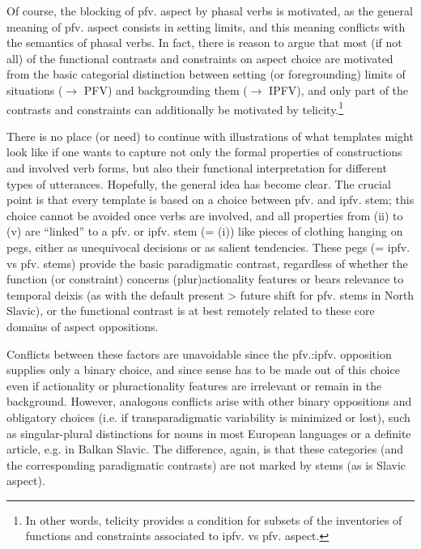 \documentclass[output=paper]{langscibook}
\begin{document}
Of course, the blocking of pfv. aspect by phasal verbs is motivated, as the general meaning of pfv. aspect consists in setting limits, and this meaning conflicts with the semantics of phasal verbs. In fact, there is reason to argue that most (if not all) of the functional contrasts and constraints on aspect choice are motivated from the basic categorial distinction between setting (or foregrounding) limits of situations (${\rightarrow}$ PFV) and backgrounding them (${\rightarrow}$ IPFV), and only part of the contrasts and constraints can additionally be motivated by telicity.\footnote{In other words, telicity provides a condition for subsets of the inventories of functions and constraints associated to ipfv. vs pfv. aspect.}

There is no place (or need) to continue with illustrations of what templates might look like if one wants to capture not only the formal properties of constructions and involved verb forms, but also their functional interpretation for different types of utterances. Hopefully, the general idea has become clear. The crucial point is that every template is based on a choice between pfv. and ipfv. stem; this choice cannot be avoided once verbs are involved, and all properties from (ii) to (v) are “linked” to a pfv. or ipfv. stem (= (i)) like pieces of clothing hanging on pegs, either as unequivocal decisions or as salient tendencies. These pegs (= ipfv. vs pfv. stems) provide the basic paradigmatic contrast, regardless of whether the function (or constraint) concerns (plur)actionality features or bears relevance to temporal deixis (as with the default present > future shift for pfv. stems in North Slavic), or the functional contrast is at best remotely related to these core domains of aspect oppositions.

Conflicts between these factors are unavoidable since the pfv.:ipfv. opposition supplies only a binary choice, and since sense has to be made out of this choice even if actionality or pluractionality features are irrelevant or remain in the background. However, analogous conflicts arise with other binary oppositions and obligatory choices (i.e. if transparadigmatic variability is minimized or lost), such as singular-plural distinctions for nouns in most European languages or a definite article, e.g. in Balkan Slavic. The difference, again, is that these categories (and the corresponding paradigmatic contrasts) are not marked by stems (as is Slavic aspect).\largerpage[1.5]
\end{document}
